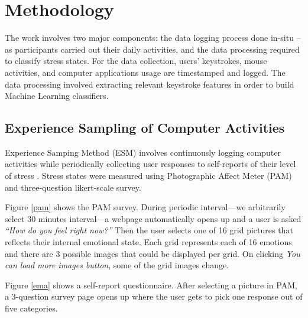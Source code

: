 \documentclass{article}
\begin{document}
\section{Methodology}
The work involves two major components: the data logging process done in-situ -- as participants carried out their daily activities, and the data processing required to classify stress states. For the data collection, users' keystrokes, mouse activities, and computer applications usage are timestamped and logged. The data processing involved extracting relevant keystroke features in order to build Machine Learning classifiers. 

\subsection{Experience Sampling of Computer Activities}
Experience Samping Method (ESM) involves continuously logging computer activities while periodically collecting user responses to self-reports of their level of stress \cite{hektner2007experience}. Stress states were measured using Photographic Affect Meter (PAM) \cite{pollak2011pam}and three-question likert-scale survey. 

Figure \ref{pam} shows the PAM survey. During periodic interval---we arbitrarily select 30 minutes interval---a webpage automatically opens up and a user is asked \textit{``How do you feel right now?''} Then the user selects one of 16 grid pictures that reflects their internal emotional state. Each grid represents each of 16 emotions and there are 3 possible images that could be displayed per grid.  On clicking \textit{You can load more images button}, some of the grid images change.

Figure \ref{ema} shows a self-report questionnaire. After selecting a picture in PAM, a 3-question survey page opens up where the user gets to pick one response out of five categories. 
\end{document}
